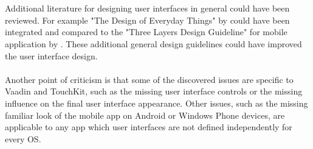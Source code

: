 \\
\\
Additional literature for designing user interfaces in general could have been reviewed. For example "The Design of Everyday Things" by \cite{Norman2002} could have been integrated and compared to the "Three Layers Design Guideline" for mobile application by \cite{AyobNurulZakiahbinti.2009}. These additional general design guidelines could have improved the user interface design.
\\
\\
Another point of criticism is that some of the discovered issues are specific to Vaadin and TouchKit, such as the missing user interface controls or the missing influence on the final user interface appearance. Other issues, such as the missing familiar look of the mobile app on Android or Windows Phone devices, are applicable to any app which user interfaces are not defined independently for every OS.